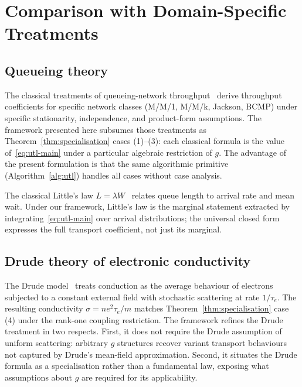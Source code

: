 \documentclass[twocolumn,11pt,a4paper]{article}
\newcommand{\cpl}{g}
\begin{document}
\section{Comparison with Domain-Specific Treatments}
\label{sec:comparison}

\subsection{Queueing theory}

The classical treatments of queueing-network throughput~\citep{kleinrock1975,jackson1957,baskett1975,gordon1967closed} derive throughput coefficients for specific network classes (M/M/1, M/M/k, Jackson, BCMP) under specific stationarity, independence, and product-form assumptions. The framework presented here subsumes those treatments as Theorem~\ref{thm:specialisation} cases (1)--(3): each classical formula is the value of~\eqref{eq:utl-main} under a particular algebraic restriction of $\cpl$. The advantage of the present formulation is that the same algorithmic primitive (Algorithm~\ref{alg:utl}) handles all cases without case analysis.

The classical Little's law $L = \lambda W$~\citep{little1961proof} relates queue length to arrival rate and mean wait. Under our framework, Little's law is the marginal statement extracted by integrating~\eqref{eq:utl-main} over arrival distributions; the universal closed form expresses the full transport coefficient, not just its marginal.

\subsection{Drude theory of electronic conductivity}

The Drude model~\citep{drude1900,sommerfeld1928} treats conduction as the average behaviour of electrons subjected to a constant external field with stochastic scattering at rate $1/\tau_e$. The resulting conductivity $\sigma = n e^2 \tau_e / m$ matches Theorem~\ref{thm:specialisation} case (4) under the rank-one coupling restriction. The framework refines the Drude treatment in two respects. First, it does not require the Drude assumption of uniform scattering: arbitrary $\cpl$ structures recover variant transport behaviours not captured by Drude's mean-field approximation. Second, it situates the Drude formula as a specialisation rather than a fundamental law, exposing what assumptions about $\cpl$ are required for its applicability.
\end{document}
